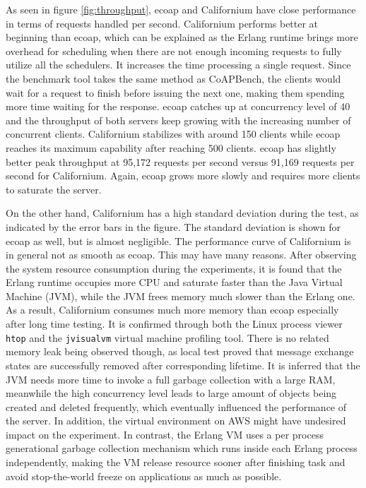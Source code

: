 As seen in figure \ref{fig:throughput}, ecoap and Californium have close performance in terms of requests handled per second. Californium performs better at beginning than ecoap, which can be explained as the Erlang runtime brings more overhead for scheduling when there are not enough incoming requests to fully utilize all the schedulers. It increases the time processing a single request. Since the benchmark tool takes the same method as CoAPBench, the clients would wait for a request to finish before issuing the next one, making them spending more time waiting for the response. ecoap catches up at concurrency level of 40 and the throughput of both servers keep growing with the increasing number of concurrent clients. Californium stabilizes with around 150 clients while ecoap reaches its maximum capability after reaching 500 clients. ecoap has slightly better peak throughput at 95,172 requests per second versus 91,169 requests per second for Californium. Again, ecoap grows more slowly and requires more clients to saturate the server.

On the other hand, Californium has a high standard deviation during the test, as indicated by the error bars in the figure. The standard deviation is shown for ecoap as well, but is almost negligible. The performance curve of Californium is in general not as smooth as ecoap.
This may have many reasons. After observing the system resource consumption during the experiments, it is found that the Erlang runtime occupies more CPU and saturate faster than the Java Virtual Machine (JVM), while the JVM frees memory much slower than the Erlang one. As a result, Californium consumes much more memory than ecoap especially after long time testing. It is confirmed through both the Linux process viewer \verb|htop| and the \verb|jvisualvm| \cite{jvisualvm} virtual machine profiling tool. There is no related memory leak being observed though, as local test proved that message exchange states are successfully removed after corresponding lifetime. It is inferred that the JVM needs more time to invoke a full garbage collection with a large RAM, meanwhile the high concurrency level leads to large amount of objects being created and deleted frequently, which eventually influenced the performance of the server. In addition, the virtual environment on AWS might have undesired impact on the experiment. In contrast, the Erlang VM uses a per process generational garbage collection mechanism which runs inside each Erlang process independently, making the VM release resource sooner after finishing task and avoid stop-the-world freeze on applications as much as possible. 

